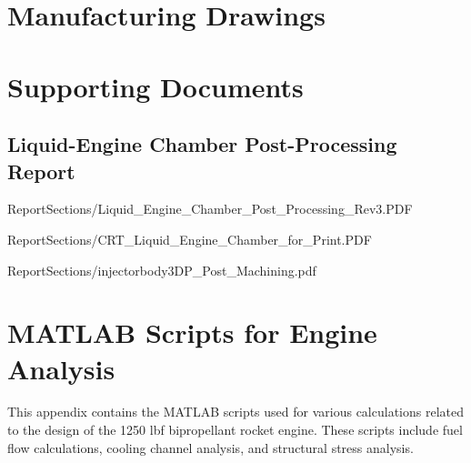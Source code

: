 \appendix
\section{Manufacturing Drawings}

\section{Supporting Documents}\label{app:supportDocs}

\subsection{Liquid-Engine Chamber Post-Processing Report}\label{doc:chamberPost}

{ReportSections/Liquid_Engine_Chamber_Post_Processing_Rev3.PDF}


{ReportSections/CRT_Liquid_Engine_Chamber_for_Print.PDF}


{ReportSections/injectorbody3DP_Post_Machining.pdf}



\section{MATLAB Scripts for Engine Analysis}

This appendix contains the MATLAB scripts used for various calculations related to the design of the 1250 lbf bipropellant rocket engine. These scripts include fuel flow calculations, cooling channel analysis, and structural stress analysis.


